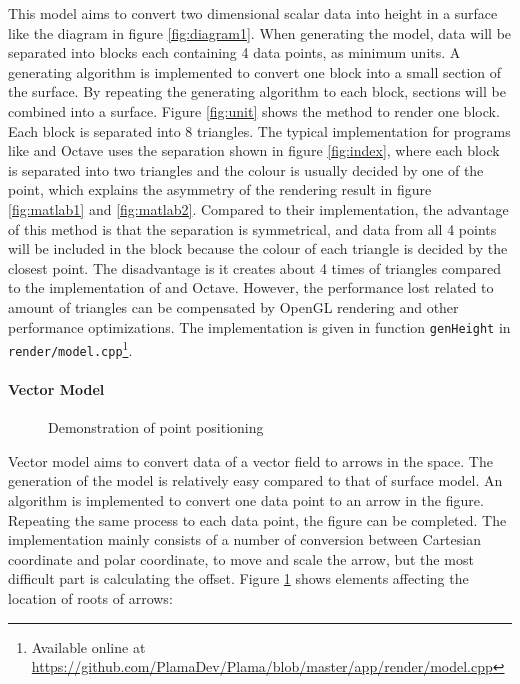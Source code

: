 This model aims to convert two dimensional scalar data into height in a surface like the diagram in figure \ref{fig:diagram1}. When generating the model, data will be separated into blocks each containing 4 data points, as minimum units. A generating algorithm is implemented to convert one block into a small section of the surface. By repeating the generating algorithm to each block, sections will be combined into a surface. Figure \ref{fig:unit} shows the method to render one block. Each block is separated into 8 triangles. The typical implementation for programs like \MatLab{} and Octave uses the separation shown in figure \ref{fig:index}, where each block is separated into two triangles and the colour is usually decided by one of the point, which explains the asymmetry of the rendering result in figure \ref{fig:matlab1} and \ref{fig:matlab2}. Compared to their implementation, the advantage of this method is that the separation is symmetrical, and data from all 4 points will be included in the block because the colour of each triangle is decided by the closest point. The disadvantage is it creates about 4 times of triangles compared to the implementation of \MatLab{} and Octave. However, the performance lost related to amount of triangles can be compensated by OpenGL rendering and other performance optimizations. The implementation is given in function \lstinline{genHeight} in \lstinline{render/model.cpp}\footnote{\label{ftnt:model}Available online at \url{https://github.com/PlamaDev/Plama/blob/master/app/render/model.cpp}}.

\paragraph{Vector Model}

\begin{figure}[!tb]
	\centering
	 \hspace{1.5em}
	\caption{Demonstration of point positioning}
	\label{fig:vec}
\end{figure}

Vector model aims to convert data of a vector field to arrows in the space. The generation of the model is relatively easy compared to that of surface model. An algorithm is implemented to convert one data point to an arrow in the figure. Repeating the same process to each data point, the figure can be completed. The implementation mainly consists of a number of conversion between Cartesian coordinate and polar coordinate, to move and scale the arrow, but the most difficult part is calculating the offset. Figure \ref{fig:vec} shows elements affecting the location of roots of arrows:


